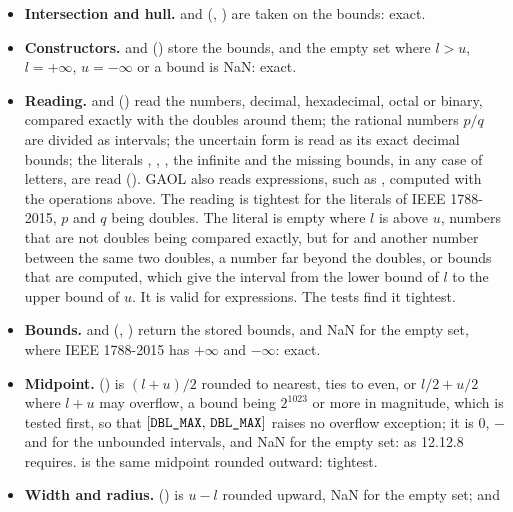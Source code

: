 \documentclass[12pt,a4paper,twoside,openright]{book}
\begin{document}
\begin{itemize}
\item[$\bullet$] \textbf{Intersection and hull.}  and
   (, ) are taken on the
  bounds: exact.
\item[$\bullet$] \textbf{Constructors.}  and
   () store the bounds, and the
  empty set where $l>u$, $l=+\infty$, $u=-\infty$ or a bound is NaN:
  exact.
\item[$\bullet$] \textbf{Reading.}  and
   () read the numbers, decimal,
  hexadecimal, octal or binary, compared exactly with the doubles around
  them; the rational numbers $p/q$ are divided as intervals; the uncertain
  form is read as its exact decimal bounds; the literals \code{[ ]},
  \code{[empty]}, \code{[entire]}, the infinite and the missing bounds, in
  any case of letters, are read (). GAOL also
  reads expressions, such as , computed with the
  operations above. The reading is tightest for the literals of IEEE
  1788-2015, $p$ and $q$ being doubles. The literal \code{[l, u]} is empty
  where $l$ is above $u$, numbers that are not doubles being compared
  exactly, but for  and another number between the same two
  doubles, a number far beyond the doubles, or bounds that are computed,
  which give the interval from the lower bound of $l$ to the upper bound of
  $u$.\newinvfive{} It is valid for expressions. The tests find it
  tightest.
\item[$\bullet$] \textbf{Bounds.}  and 
  (, ) return the stored bounds, and NaN for the empty
  set, where IEEE 1788-2015 has $+\infty$ and $-\infty$: exact.
\item[$\bullet$] \textbf{Midpoint.}  () is
  $(l+u)/2$ rounded to nearest, ties to even, or $l/2+u/2$ where $l+u$ may
  overflow, a bound being $2^{1023}$ or more in magnitude, which is tested
  first, so that $[\texttt{DBL\_MAX},\,\texttt{DBL\_MAX}]$ raises no
  overflow exception;\newinvfive{} it is $0$, $-$ and
   for the unbounded intervals, and NaN for the empty set:
  as 12.12.8 requires.  is the same midpoint rounded outward:
  tightest.
\item[$\bullet$] \textbf{Width and radius.}  () is
  $u-l$ rounded upward, NaN for the empty set;  and

\end{itemize}
\end{document}

